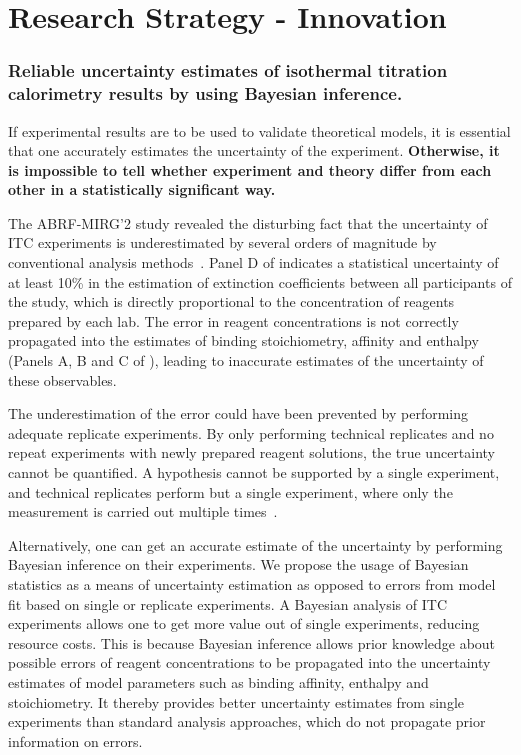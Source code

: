 \documentclass[10pt,final]{article}
\newif\ifinstr
\newcommand{\instr}[1]{\ifdraft{\ifinstr {\color{cyan}\emph{#1}} \fi}{}}
\begin{document}
\section*{Research Strategy - Innovation}
\instr{Explain how your proposal differs from what others have tried.}
\subsubsection*{Reliable uncertainty estimates of isothermal titration calorimetry results by using Bayesian inference.}
If experimental results are to be used to validate theoretical models, it is essential that one accurately estimates the uncertainty of the experiment. 
%
\textbf{Otherwise, it is impossible to tell whether experiment and theory differ from each other in a statistically significant way.}

The ABRF-MIRG'2 study revealed the disturbing fact that the uncertainty of ITC experiments is underestimated by several orders of magnitude by conventional analysis methods~\autocite{Myszka2003a}.
%
Panel D of  indicates a statistical uncertainty of at least 10\% in the estimation of extinction coefficients between all participants of the study, which is directly proportional to the concentration of reagents prepared by each lab. 
%
The error in reagent concentrations is not correctly propagated into the estimates of binding stoichiometry, affinity and enthalpy  (Panels A, B and C of ), leading to inaccurate estimates of the uncertainty of these observables.

The underestimation of the error could have been prevented by performing adequate replicate experiments.
%
By only performing technical replicates and no repeat experiments with newly prepared reagent solutions, the true uncertainty cannot be quantified.
%
A hypothesis cannot be supported by a single experiment, and technical replicates perform but a single experiment, where only the measurement is carried out multiple times~\autocite{Vaux2012a}.

Alternatively, one can get an accurate estimate of the uncertainty by performing Bayesian inference on their experiments.
%
We propose the usage of Bayesian statistics as a means of uncertainty estimation as opposed to errors from model fit based on single or replicate experiments.
%
A Bayesian analysis of ITC experiments allows one to get more value out of single experiments, reducing resource costs. 
%
This is because Bayesian inference allows prior knowledge about possible errors of reagent concentrations to be propagated into the uncertainty estimates of model parameters such as binding affinity, enthalpy and stoichiometry. 
%
It thereby provides better uncertainty estimates from single experiments than standard analysis approaches, which do not propagate prior information on errors.
\end{document}
